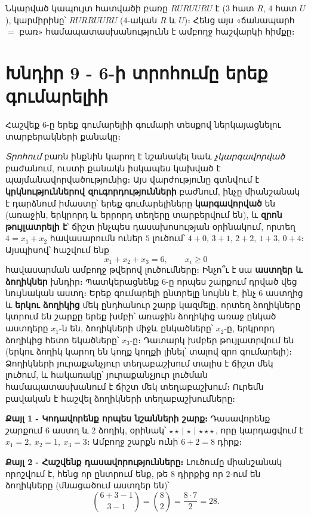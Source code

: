 \documentclass[11pt,a4paper]{article}
\begin{document}
Նկարված կապույտ հատվածի բառը $RURUURU$ է ($3$ հատ $R$, $4$ հատ $U$), կարմիրինը՝ $RURRUURU$ ($4$-ական
$R$ և $U$)։ Հենց այս «ճանապարհ $=$ բառ» համապատասխանությունն է ամբողջ հաշվարկի հիմքը։

\section*{Խնդիր 9 - 6-ի տրոհումը երեք գումարելիի}

\begin{problembox}[9]
Հաշվեք $6$-ը երեք գումարելիի գումարի տեսքով ներկայացնելու տարբերակների քանակը։
\end{problembox}

\begin{ideabox}
\emph{Տրոհում} բառն ինքնին կարող է նշանակել նաև \emph{չկարգավորված} բաժանում, ուստի քանակն
իսկապես կախված է պայմանավորվածությունից։ Այս վարժությունը գտնվում է \textbf{կրկնություններով
զուգորդությունների} բաժնում, ինչը միանշանակ է դարձնում իմաստը՝ երեք գումարելիները
\textbf{կարգավորված} են (առաջին, երկրորդ և երրորդ տեղերը տարբերվում են), և \textbf{զրոն
թույլատրելի է}՝ ճիշտ ինչպես դասախոսության օրինակում, որտեղ $4=x_1+x_2$
հավասարումն ուներ $5$ լուծում՝ $4{+}0,\,3{+}1,\,2{+}2,\,1{+}3,\,0{+}4$։ Այսպիսով՝ հաշվում ենք
$$x_1+x_2+x_3=6,\qquad x_i\ge 0$$
հավասարման ամբողջ թվերով լուծումները։ Ինչո՞ւ է սա \textbf{աստղեր և ձողիկներ} խնդիր։ Պատկերացնենք
$6$-ը որպես շարքում դրված վեց նույնական աստղ։ Երեք գումարելի ընտրելը նույնն է, ինչ $6$ աստղից և
\textbf{երկու ձողիկից} մեկ ընդհանուր շարք կազմելը, որտեղ ձողիկները կտրում են շարքը երեք խմբի՝
առաջին ձողիկից առաջ ընկած աստղերը $x_1$-ն են, ձողիկների միջև ընկածները՝ $x_2$-ը, երկրորդ ձողիկից
հետո եկածները՝ $x_3$-ը։ Դատարկ խմբեր թույլատրվում են (երկու ձողիկ կարող են կողք կողքի լինել՝ տալով
զրո գումարելի)։ Ձողիկների յուրաքանչյուր տեղաբաշխում տալիս է ճիշտ մեկ լուծում, և հակառակը՝
յուրաքանչյուր լուծման համապատասխանում է ճիշտ մեկ տեղաբաշխում։ Ուրեմն բավական է հաշվել ձողիկների
տեղաբաշխումները։
\end{ideabox}

\textbf{Քայլ 1 - Կոդավորենք որպես նշանների շարք։}
Դասավորենք շարքում $6$ աստղ և $2$ ձողիկ, օրինակ՝ $\star\star\,|\,\star\,|\,\star\star\star$, որը
կարդացվում է $x_1=2,\ x_2=1,\ x_3=3$։ Ամբողջ շարքն ունի $6+2=8$ դիրք։

\textbf{Քայլ 2 - Հաշվենք դասավորությունները։}
Լուծումը միանշանակ որոշվում է, հենց որ ընտրում ենք, թե $8$ դիրքից որ $2$-ում են ձողիկները (մնացածում
աստղեր են)՝
$$\binom{6+3-1}{3-1}=\binom{8}{2}=\frac{8\cdot 7}{2}=28.$$
\end{document}
